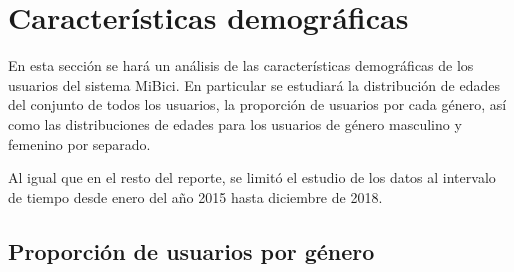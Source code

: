 \section*{Características demográficas}
En esta sección se hará un análisis de las características demográficas de los usuarios del sistema MiBici. En particular se estudiará la distribución de edades del conjunto de todos los usuarios, la proporción de usuarios por cada género, así como las distribuciones de edades para los usuarios de género masculino y femenino por separado.
\par Al igual que en el resto del reporte, se limitó el estudio de los datos al intervalo de tiempo desde enero del año 2015 hasta diciembre de 2018.
\subsection*{Proporción de usuarios por género}